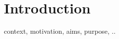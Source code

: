 \chapter{Introduction}
\label{ch:einleitung}

context, motivation, aims, purpose, ..


%
%

%		





